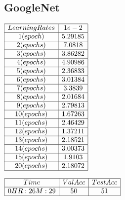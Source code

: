 \documentclass[conference]{IEEEtran}
\begin{document}
\subsection{GoogleNet} \label{GoogleNet}
\begin{center}
    $\begin{array}{| c | c |}
            \hline 
                Learning Rates & 1{e-2} \\ 
            \hline 
                1 (epoch)    & 5.29185 \\ 
            \hline 
                2 (epochs)  & 7.0818 \\
            \hline
                3 (epochs)  & 3.86282 \\
            \hline
                4 (epochs)  & 4.90986 \\
            \hline
                5 (epochs)  & 2.36833 \\
            \hline
                6 (epochs) & 3.01384 \\
            \hline
                7 (epochs) & 3.3839 \\
            \hline
                8 (epochs) & 2.01684 \\
            \hline
                9 (epochs) & 2.79813 \\
            \hline
                10 (epochs) & 1.67263 \\
            \hline
                11 (epochs) & 2.46429 \\
            \hline
                12 (epochs) & 1.37211 \\
            \hline
                13 (epochs) & 2.18521 \\
            \hline
                14 (epochs) & 3.00373 \\
            \hline
                15 (epochs) & 1.9103 \\
            \hline
                20 (epochs) & 2.18072 \\
            \hline
    \end{array}$
\end{center}
\begin{center}
    $\begin{array}{| c | c | c | c |}
            \hline 
                Time & Val Acc & Test Acc \\ 
            \hline 
                0HR:26M:29 & 50 & 51 \\ 
            \hline
    \end{array}$
\end{center}
\end{document}
